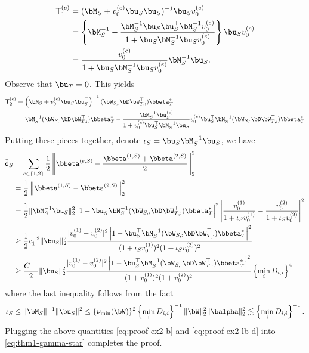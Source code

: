 \documentclass[10pt]{article}
\numberwithin{equation}{section}
\begin{document}
\begin{align*}
	\mathsf{T}_1^{(e)} &= (\bM_S + v_0^{(e)} \bu_S \bu_S)^{-1} \bu_S v_0^{(e)}\\
	&= \left\{\bM_S^{-1} - \frac{\bM_S^{-1} \bu_S \bu_S^\top \bM_S^{-1} v_0^{(e)}}{1+\bu_S \bM_S^{-1} \bu_S v_0^{(e)}}\right\} \bu_S v_0^{(e)} \\
	&= \frac{v_0^{(e)}}{1 + \bu_S \bM_S^{-1} \bu_S v_0^{(e)}} \bM_S^{-1} \bu_S.
\end{align*}
Observe that $\bu_T = 0$. This yields
\begin{align*}
	\mathsf{T}_2^{(e)} &= \left(\bM_S + v_0^{(e)} \bu_S \bu_S^\top \right)^{-1} (\bW_{S,:} \bD \bW_{T,:}^\top) \bbeta_T^* \\
	&= \bM_S^{-1} (\bW_{S,:} \bD \bW_{T,:}^\top) \bbeta_T^* - \frac{\bM_S^{-1} \bu_S^{(e)}}{1+v_0^{(e)} \bu_S^\top\bM_S^{-1} \bu_S} v_0^{(e)} \bu_S^\top \bM_S^{-1} (\bW_{S,:} \bD \bW_{T,:}^\top) \bbeta_T^*
\end{align*}
Putting these pieces together, denote $\iota_S = \bu_S \bM_S^{-1} \bu_S$, we have 
\begin{align}
	\bar{\mathsf{d}}_S &= \sum_{e\in \{1,2\}} \frac{1}{2} \left\|\bbeta^{(e,S)}- \frac{\bbeta^{(1,S)} + \bbeta^{(2,S)}}{2}\right\|_2^2 \nonumber\\
				 &= \frac{1}{2} \left\|\bbeta^{(1,S)} - \bbeta^{(2,S)}\right\|_2^2 \nonumber\\
				 &= \frac{1}{2} \|\bM_S^{-1} \bu_S\|_2^2 \left|1 - \bu_S^\top \bM_S^{-1} (\bW_{S,:} \bD \bW_{T,:}^\top) \bbeta_T^*\right|^2 \left|\frac{v_0^{(1)}}{1+\iota_S v_0^{(1)}} - \frac{v_0^{(2)}}{1+\iota_S v_0^{(2)}} \right|^2 \nonumber\\
				 &\ge \frac{1}{2} c_1^{-2} \|\bu_S\|_2^2 \frac{|v_0^{(1)} - v_0^{(2)}|^2 \left|1 - \bu_S^\top \bM_S^{-1} (\bW_{S,:} \bD \bW_{T,:}^\top) \bbeta_T^*\right|^2 }{(1 + \iota_S v_0^{(1)})^2(1 + \iota_S v_0^{(2)})^2} \nonumber\\
				 &\ge \frac{C^{-1}}{2} \|\bu_S\|_2^2 \frac{|v_0^{(1)} - v_0^{(2)}|^2 \left|1 - \bu_S^\top \bM_S^{-1} (\bW_{S,:} \bD \bW_{T,:}^\top) \bbeta_T^*\right|^2 }{(1 + v_0^{(1)})^2(1 + v_0^{(2)})^2} \left\{\min_{i} D_{i,i} \right\}^{4} \label{eq:proof-ex2-lb-d}
\end{align} where the last inequality follows from the fact
\begin{align*}
	\iota_S \le \|\bM_S\|^{-1} \|\bu_S\|^2 \le \{\nu_{\min}(\bW)\}^2 \left\{\min_{i} D_{i,i} \right\}^{-1} \|\bW\|_2^2 \|\balpha\|_2^2 \lesssim \left\{\min_{i} D_{i,i} \right\}^{-1}.
\end{align*} Plugging the above quantities \eqref{eq:proof-ex2-b} and \eqref{eq:proof-ex2-lb-d} into \eqref{eq:thm1-gamma-star} completes the proof.
\end{document}
